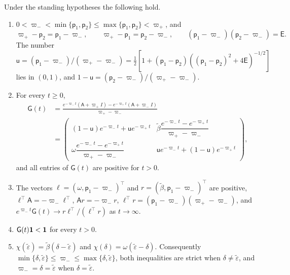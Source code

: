 \begin{lemma}\label{lem:evo-semigroup}
Under the standing hypotheses the following hold.
\begin{enumerate}
\item[(i)] $0<\varpi_-<\min\{\mathsf p_1,\mathsf p_2\}\le\max\{\mathsf p_1,\mathsf p_2\}<\varpi_+$, and
\begin{equation}\label{eq:evo-root-identities}
\varpi_+-\mathsf p_2=\mathsf p_1-\varpi_-,\qquad\varpi_+-\mathsf p_1=\mathsf p_2-\varpi_-,\qquad(\mathsf p_1-\varpi_-)(\mathsf p_2-\varpi_-)=\mathsf E.
\end{equation}
The number $\mathsf u=(\mathsf p_1-\varpi_-)/(\varpi_+-\varpi_-)=\frac12[1+(\mathsf p_1-\mathsf p_2)((\mathsf p_1-\mathsf p_2)^2+4\mathsf E)^{-1/2}]$ lies in $(0,1)$, and $1-\mathsf u=(\mathsf p_2-\varpi_-)/(\varpi_+-\varpi_-)$.
\item[(ii)] For every $t\ge0$,
\begin{equation}\label{eq:evo-semigroup}
\begin{aligned}
\mathsf G(t)&=\frac{e^{-\varpi_-t}(\mathsf A+\varpi_+I)-e^{-\varpi_+t}(\mathsf A+\varpi_-I)}{\varpi_+-\varpi_-}\\
&=\begin{pmatrix}(1-\mathsf u)e^{-\varpi_-t}+\mathsf ue^{-\varpi_+t}&\tilde\beta\dfrac{e^{-\varpi_-t}-e^{-\varpi_+t}}{\varpi_+-\varpi_-}\\[2ex]\omega\dfrac{e^{-\varpi_-t}-e^{-\varpi_+t}}{\varpi_+-\varpi_-}&\mathsf ue^{-\varpi_-t}+(1-\mathsf u)e^{-\varpi_+t}\end{pmatrix},
\end{aligned}
\end{equation}
and all entries of $\mathsf G(t)$ are positive for $t>0$.
\item[(iii)] The vectors $\ell=(\omega,\mathsf p_1-\varpi_-)^\top$ and $r=(\tilde\beta,\mathsf p_1-\varpi_-)^\top$ are positive, $\ell^\top\mathsf A=-\varpi_-\ell^\top$, $\mathsf Ar=-\varpi_-r$, $\ell^\top r=(\mathsf p_1-\varpi_-)(\varpi_+-\varpi_-)$, and $e^{\varpi_-t}\mathsf G(t)\to r\ell^\top/(\ell^\top r)$ as $t\to\infty$.
\item[(iv)] $\mathsf G(t)\mathbf{1}<\mathbf{1}$ for every $t>0$.
\item[(v)] $\chi(\tilde\varepsilon)=\tilde\beta(\delta-\tilde\varepsilon)$ and $\chi(\delta)=\omega(\tilde\varepsilon-\delta)$. Consequently $\min\{\delta,\tilde\varepsilon\}\le\varpi_-\le\max\{\delta,\tilde\varepsilon\}$, both inequalities are strict when $\delta\ne\tilde\varepsilon$, and $\varpi_-=\delta=\tilde\varepsilon$ when $\delta=\tilde\varepsilon$.
\end{enumerate}
\end{lemma}

